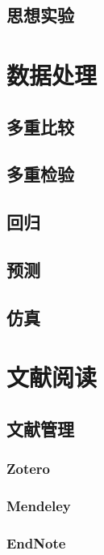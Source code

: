 \documentclass[]{book}
\begin{document}
\section{思想实验}

\chapter{数据处理}

\section{多重比较}

\section{多重检验}

\section{回归}

\section{预测}

\section{仿真}

\chapter{文献阅读}

\section{文献管理}

\subsection{Zotero}\label{zotero}

\subsection{Mendeley}\label{mendeley}

\subsection{EndNote}\label{endnote}
\end{document}
